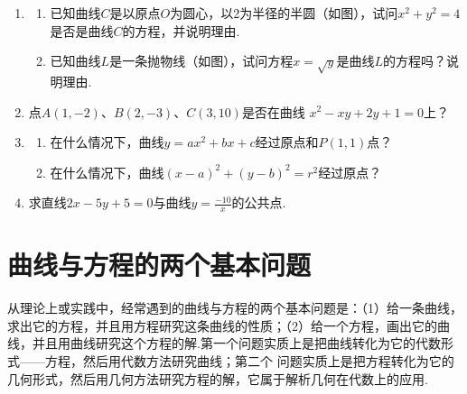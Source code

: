 \begin{ex}
\begin{enumerate}
    \item \begin{enumerate}[(1)]
        \item 已知曲线$C$是以原点$O$为圆心，以2为半径的半圆（如图），试问$x^2+y^2=4$是否是曲线$C$的方程，并说明理由.
        \item 已知曲线$L$是一条抛物线（如图），试问方程$x=\sqrt{y}$是曲线$L$的方程吗？说明理由.
    \end{enumerate}
\begin{center}
\end{center}

\item 点$A(1,-2)$、$B(2,-3)$、$C(3,10)$是否在曲线
$x^2-xy+2y+1=0$上？
\item \begin{enumerate}[(1)]
\item 在什么情况下，曲线$y=ax^2+bx+c$经过原点和$P(1,1)$点？
\item 在什么情况下，曲线$(x-a)^2+(y-b)^2=r^2$经过原点？
\end{enumerate}

\item 求直线$2x-5y+5=0$与曲线$y=\frac{-10}{x}$的公共点.
\end{enumerate}
\end{ex}

\section{曲线与方程的两个基本问题}
从理论上或实践中，经常遇到的曲线与方程的两个基本问题是：（1）给一条曲线，求出它的方程，并且用方程研究这条曲线的性质；（2）给一个方程，画出它的曲线，并且用曲线研究这个方程的解.第一个问题实质上是把曲线转化为它的代数形式——方程，然后用代数方法研究曲线；第二个
问题实质上是把方程转化为它的几何形式，然后用几何方法研究方程的解，它属于解析几何在代数上的应用.

